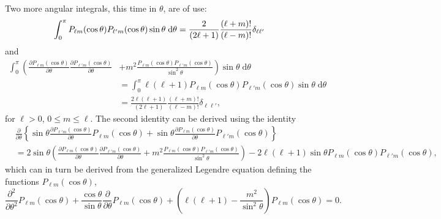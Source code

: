 Two more angular integrals, this time in $\theta$, are of use:
\begin{equation}
\int_0^\pi P_{\ell m}(\cos\theta)P_{\ell'm}(\cos\theta)\sin\theta\;\mathrm{d}\theta = \frac{2}{(2\ell + 1)}\frac{(\ell + m)!}{(\ell - m)!}\delta_{\ell\ell'}\\
\end{equation}
and
\begin{equation}
\begin{split}
\int_0^\pi\left(\frac{\partial P_{\ell m}(\cos\theta)}{\partial\theta}\frac{\partial P_{\ell'm}(\cos\theta)}{\partial\theta}\right. &+ \left.m^2\frac{P_{\ell m}(\cos\theta)P_{\ell'm}(\cos\theta)}{\sin^2\theta}\right)\sin\theta\;\mathrm{d}\theta\\
&= \int_0^\pi\ell(\ell + 1)P_{\ell m}(\cos\theta)P_{\ell'm}(\cos\theta)\sin\theta\;\mathrm{d}\theta\\
&= \frac{2\ell(\ell + 1)}{(2\ell + 1)}\frac{(\ell + m)!}{(\ell - m)!}\delta_{\ell\ell'},
\end{split}
\end{equation}
for $\ell > 0$, $0 \leq m \leq \ell$. The second identity can be derived using the identity
\begin{equation}
\begin{split}
&\frac{\partial}{\partial\theta}\left\{\sin\theta\frac{\partial P_{\ell'm}(\cos\theta)}{\partial\theta}P_{\ell m}(\cos\theta) + \sin\theta\frac{\partial P_{\ell m}(\cos\theta)}{\partial \theta}P_{\ell' m}(\cos\theta)\right\}\\
&= 2\sin\theta\left(\frac{\partial P_{\ell m}(\cos\theta)}{\partial\theta}\frac{\partial P_{\ell'm}(\cos\theta)}{\partial\theta} + m^2\frac{P_{\ell m}(\cos\theta)P_{\ell'm}(\cos\theta)}{\sin^2\theta}\right) - 2\ell(\ell + 1)\sin\theta P_{\ell m}(\cos\theta)P_{\ell' m}(\cos\theta),
\end{split}
\end{equation}
which can in turn be derived from the generalized Legendre equation defining the functions $P_{\ell m}(\cos\theta)$,
\begin{equation}
\frac{\partial^2}{\partial\theta^2}P_{\ell m}(\cos\theta) + \frac{\cos\theta}{\sin\theta}\frac{\partial}{\partial\theta}P_{\ell m}(\cos\theta) + \left(\ell(\ell + 1) - \frac{m^2}{\sin^2\theta}\right)P_{\ell m}(\cos\theta) = 0.
\end{equation}

